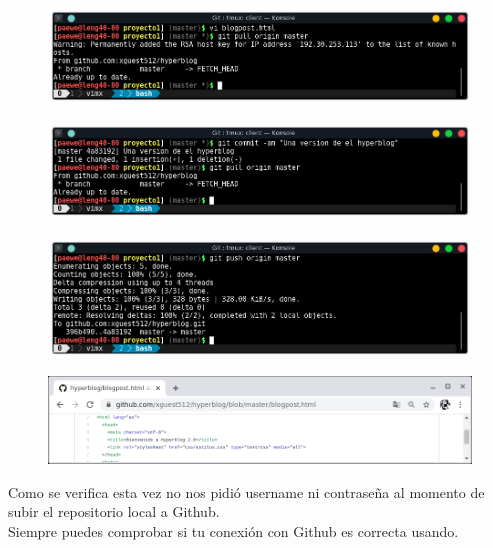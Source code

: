 \documentclass{article}
\begin{document}
\begin{figure}[h!]
  \centering
  \includegraphics[scale=0.75]{./Pictures/231_pull.png}
\end{figure}

\newpage

\begin{figure}[h!]
  \centering
  \includegraphics[scale=0.75]{./Pictures/232_git_commit.png}
\end{figure}

\begin{figure}[h!]
  \centering
  \includegraphics[scale=0.75]{./Pictures/233_push.png}
\end{figure}

\begin{figure}[h!]
  \centering
  \includegraphics[scale=0.75]{./Pictures/234_changed_repo_github.png}
\end{figure}

Como se verifica esta vez no nos pidió username ni contraseña al momento de
subir el repositorio local a Github.\\

Siempre puedes comprobar si tu conexión con Github es correcta usando.
\end{document}
